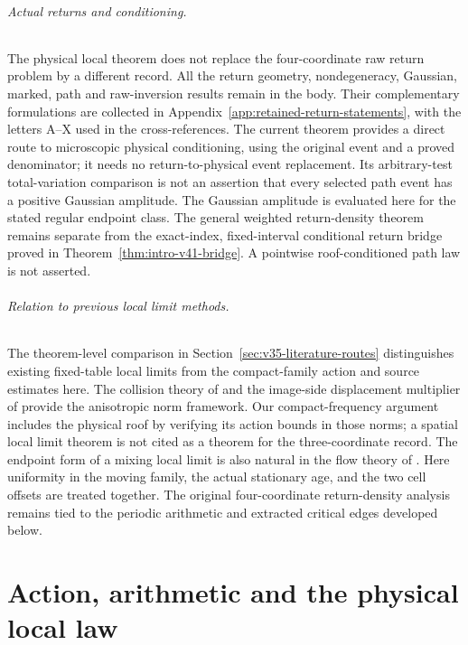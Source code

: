 \documentclass[11pt,reqno]{amsart}
\numberwithin{equation}{section}
\theoremstyle{definition}\newtheorem{definition}[theorem]{Definition}
\theoremstyle{remark}\newtheorem{remark}[theorem]{Remark}
\begin{document}
\paragraph{Actual returns and conditioning.}
The physical local theorem does not replace the four-coordinate raw
return problem by a different record. All the return geometry,
nondegeneracy, Gaussian, marked, path and raw-inversion results remain
in the body. Their complementary formulations are collected in
Appendix~\ref{app:retained-return-statements}, with the letters A--X
used in the cross-references. The current theorem provides a direct
route to microscopic physical conditioning, using the original event
and a proved denominator; it needs no return-to-physical event
replacement. Its arbitrary-test total-variation comparison is not an
assertion that every selected path event has a positive Gaussian
amplitude. The Gaussian amplitude is evaluated here for the stated
regular endpoint class. The general weighted return-density theorem
remains separate from the exact-index, fixed-interval conditional
return bridge proved in Theorem~\ref{thm:intro-v41-bridge}. A pointwise
roof-conditioned path law is not asserted.

\paragraph{Relation to previous local limit methods.}
The theorem-level comparison in Section~\ref{sec:v35-literature-routes} distinguishes existing fixed-table local limits from the compact-family action and source estimates here. The collision theory of \cite{DZ11,DZ} and the image-side displacement
multiplier of \cite{DPZ} provide the anisotropic norm framework.
Our compact-frequency argument includes the physical roof by verifying
its action bounds in those norms; a spatial local limit theorem is not
cited as a theorem for the three-coordinate record. The endpoint form
of a mixing local limit is also natural in the flow theory of
\cite{DN}. Here uniformity in the moving family, the actual stationary
age, and the two cell offsets are treated together. The original
four-coordinate return-density analysis remains tied to the periodic
arithmetic and extracted critical edges developed below.

\part{Action, arithmetic and the physical local law}









\end{document}
